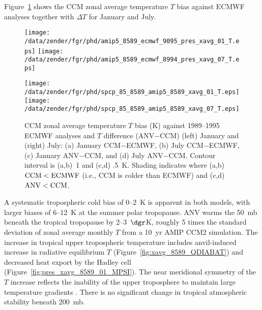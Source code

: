 \documentclass[agums]{aguplus}
\begin{document}

Figure~\ref{fig:pres_xavg_8589_T} shows the CCM zonal average
temperature $T$ bias against ECMWF analyses together with $\Delta T$
for January and July.    
\begin{figure*}
\begin{center}
\texttt{[image: /data/zender/fgr/phd/amip5\_8589\_ecmwf\_9095\_pres\_xavg\_01\_T.eps]}%
\texttt{[image: /data/zender/fgr/phd/amip5\_8589\_ecmwf\_8994\_pres\_xavg\_07\_T.eps]}%

\texttt{[image: /data/zender/fgr/phd/spcp\_85\_8589\_amip5\_8589\_xavg\_01\_T.eps]}%
\texttt{[image: /data/zender/fgr/phd/spcp\_85\_8589\_amip5\_8589\_xavg\_07\_T.eps]}%
\end{center}
\caption[CCM zonal average temperature $T$ bias against ECMWF analyses
and $T$ difference (ANV$-$CCM) for 1985--1989 January and July]{
CCM zonal average temperature $T$ bias (\dgr K) against 1989--1995
ECMWF analyses and $T$ difference (ANV$-$CCM) (left) January and
(right) July: (a) January CCM$-$ECMWF, (b) July CCM$-$ECMWF, (c)
January ANV$-$CCM, and (d) July ANV$-$CCM.
Contour interval is (a,b)~1 and (c,d) .5~\dgr K. 
Shading indicates where (a,b) $\mbox{\textrm{CCM}} < \mbox{\textrm{ECMWF}}$ (i.e., CCM is colder
than ECMWF) and (c,d) $\mbox{\textrm{ANV}} < \mbox{\textrm{CCM}}$.
\label{fig:pres_xavg_8589_T}}   
\end{figure*}
A systematic tropospheric cold bias of 0--2~\dgr K is apparent in
both models, with larger biases of 6--12~\dgr K at the summer
polar tropopause. 
ANV warms the 50~mb beneath the tropical tropopause by
2--3~$\dgr$K, roughly 5 times the standard deviation of 
zonal average monthly $T$ from a 10~yr AMIP CCM2 simulation.
The increase in tropical upper tropospheric temperature includes
anvil-induced increase in radiative equilibrium $T$
(Figure~\ref{fig:xavg_8589_QDIABAT}) and decreased heat export by the
Hadley cell (Figure~\ref{fig:pres_xavg_8589_01_MPSI}). 
The near meridional symmetry of the $T$ increase reflects the
inability of the upper troposphere to maintain large temperature
gradients \cite[]{LiH88}.
There is no significant change in tropical atmospheric stability
beneath 200~mb. 
\end{document}
